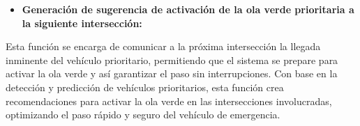 \documentclass[12pt,a4paper,oneside]{report}
\begin{document}
\begin{itemize}
{  }Una vez recibida la señal de video, se aplica un proceso de acondicionamiento que incluye la filtración para mejorar la calidad de la imagen, reduciendo el ruido y estabilizando la señal. Este procesamiento permite identificar y delimitar automáticamente las zonas relevantes dentro de las imágenes capturadas por las cámaras en las intersecciones, como carriles vehiculares, pasos peatonales y áreas de espera. Con base en los datos obtenidos del seguimiento de vehículos y utilizando modelos predictivos, se calcula la ruta probable de un vehículo de emergencia hacia la siguiente intersección. Este análisis permite coordinar anticipadamente la activación de la ola verde prioritaria para optimizar el flujo de tráfico garantizando además el desplazamiento ágil de los vehículos de emergencia.
\item
  \textbf{Generación de sugerencia de activación de la ola verde prioritaria a la siguiente intersección:}
\end{itemize}

Esta función se encarga de comunicar a la próxima intersección la llegada inminente del vehículo prioritario, permitiendo que el sistema se prepare para activar la ola verde y así garantizar el paso sin interrupciones. Con base en la detección y predicción de vehículos prioritarios, esta función crea recomendaciones para activar la ola verde en las intersecciones involucradas, optimizando el paso rápido y seguro del vehículo de emergencia.
\end{document}
